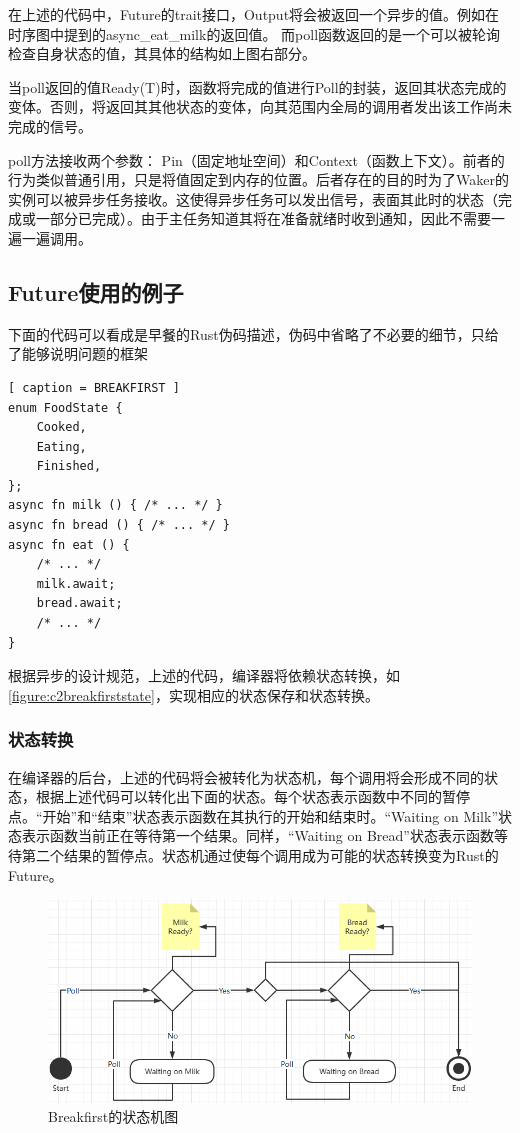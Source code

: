 在上述的代码中，Future的trait接口，Output将会被返回一个异步的值。例如在时序图中提到的async\_eat\_milk的返回值。 而poll函数返回的是一个可以被轮询检查自身状态的值，其具体的结构如上图右部分。 

当poll返回的值Ready(T)时，函数将完成的值进行Poll的封装，返回其状态完成的变体。否则，将返回其其他状态的变体，向其范围内全局的调用者发出该工作尚未完成的信号。

poll方法接收两个参数： Pin（固定地址空间）和Context（函数上下文）。前者的行为类似普通引用，只是将值固定到内存的位置。后者存在的目的时为了Waker的实例可以被异步任务接收。这使得异步任务可以发出信号，表面其此时的状态（完成或一部分已完成）。由于主任务知道其将在准备就绪时收到通知，因此不需要一遍一遍调用。

\subsection{Future使用的例子}

下面的代码可以看成是早餐的Rust伪码描述，伪码中省略了不必要的细节，只给了能够说明问题的框架

\begin{lstlisting}[ caption = BREAKFIRST ]
enum FoodState {
    Cooked,
    Eating,
    Finished,
};
async fn milk () { /* ... */ }
async fn bread () { /* ... */ }
async fn eat () {
    /* ... */
    milk.await;
    bread.await;
    /* ... */
}

\end{lstlisting}

根据异步的设计规范，上述的代码，编译器将依赖状态转换，如\autoref{figure:c2breakfirststate}，实现相应的状态保存和状态转换。

\subsubsection{状态转换}

在编译器的后台，上述的代码将会被转化为状态机，每个调用将会形成不同的状态，根据上述代码可以转化出下面的状态。每个状态表示函数中不同的暂停点。“开始”和“结束”状态表示函数在其执行的开始和结束时。“Waiting on Milk”状态表示函数当前正在等待第一个结果。同样，“Waiting on Bread”状态表示函数等待第二个结果的暂停点。状态机通过使每个调用成为可能的状态转换变为Rust的Future。

\begin{figure}[htb]
    \figureCapSet
    \centering
    \includegraphics[width=.8\linewidth]{figure/c2/breakfirststate.png}
    \caption{Breakfirst的状态机图}
    \label{figure:c2breakfirststate}
\end{figure}

